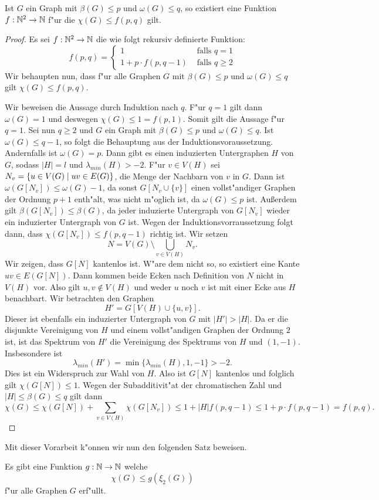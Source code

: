 \begin{lemma}
  Ist $G$ ein Graph mit $\beta(G) \leq p$ und $\omega(G) \leq q$, so existiert eine Funktion $f:{\mathbb{N}} ^{2} \to {\mathbb{N}}$ f"ur die $\chi(G) \leq f(p,q) $ gilt. 
  \label{lem:funktionxilemma}
\end{lemma}
\begin{proof}
  Es sei $f:{\mathbb{N}}^{2}\to {\mathbb{N}}$ die wie folgt rekursiv definierte Funktion:
  $$f(p,q) = \begin{cases}
    1 & \text{ falls } q = 1 \\
    1+p\cdot f(p,q-1) & \text{ falls } q \geq 2
  \end{cases}$$
  Wir behaupten nun, dass f"ur alle Graphen $G$ mit $\beta(G) \leq p$ und $\omega(G)  \leq q$ gilt $\chi(G) \leq f(p,q)$. 

  Wir beweisen die Aussage durch Induktion nach $q$. F"ur $q=1$ gilt dann $\omega(G) = 1$ und deswegen $\chi(G) \leq 1 = f(p,1)$. Somit gilt die Aussage f"ur $q=1$. 
  Sei nun $q \geq 2$ und $G$ ein Graph mit $\beta(G) \leq p$ und $\omega(G) \leq q$. Ist $\omega(G) \leq q-1$, so folgt die Behauptung aus der Induktionsvoraussetzung. 
  Andernfalls ist $\omega(G) = p$.
  Dann gibt es einen induzierten Untergraphen $H$ von $G$, sodass $|H|=l$ und $\lambda_{min}(H)> -2$. F"ur $v\in V(H)$ sei $N_v = \{u\in V(G) \;|\; uv\in E(G) \}$, die Menge der Nachbarn von
  $v$ in $G$. Dann ist $\omega(G[N_v]) \leq \omega(G) -1 $, da sonst $G[N_v\cup \{v\}]$ einen vollst"andiger Graphen der Ordnung $p+1$ enth"alt, was nicht m"oglich ist, da $\omega(G) \leq p$ ist. Au{\ss}erdem gilt $\beta(G[N_v]) \leq \beta(G)$, da jeder induzierte Untergraph von $G[N_v]$ wieder ein induzierter Untergraph von $G$ ist. Wegen der Induktionsvorraussetzung folgt dann, dass $\chi(G[N_v]) \leq f(p,q-1)$ richtig ist. 
  Wir setzen $$N = V(G) \setminus \bigcup\limits_{v\in V(H)} N_v.$$ 
  Wir zeigen, dass $G[N]$ kantenlos ist. W"are dem nicht so, so existiert eine Kante $uv\in E(G[N])$. 
  Dann kommen beide Ecken nach Definition von $N$ nicht in $V(H)$ vor. 
  Also gilt $u,v\notin V(H)$ und weder $u$ noch $v$ ist mit einer Ecke aus $H$ benachbart. Wir betrachten den Graphen $$H' = G[V(H) \cup \{u,v\}].$$ Dieser ist ebenfalls ein induzierter Untergraph von $G$ mit $|H'| > |H|$. Da er die disjunkte Vereinigung von $H$ und einem vollst"andigen Graphen der Ordnung $2$ ist, ist das Spektrum von $H'$ die Vereinigung des Spektrums von $H$ und $(1,-1)$. Insbesondere ist $$\lambda_{min}(H') = \min \{\lambda_{min}(H),1,-1\} > -2.$$ 
  Dies ist ein Widerspruch zur Wahl von $H$. Also ist $G[N]$ kantenlos und folglich gilt $\chi(G[N]) \leq 1$. 
  Wegen der Subadditivit"at der chromatischen Zahl und $|H| \leq \beta(G) \leq q$ gilt dann $$\chi(G) \leq \chi(G[N]) + \sum\limits_{v\in V(H)}\chi(G[N_v]) \leq 1 + |H|f(p,q-1)  \leq 1+p\cdot f(p,q-1)= f(p,q).$$
\end{proof}
Mit dieser Vorarbeit k"onnen wir nun den folgenden Satz beweisen.
\begin{theorem}
  Es gibt eine Funktion $g:{\mathbb{N}} \to {\mathbb{N}}$ welche $$\chi(G) \leq g(\xi_{2}(G))$$ f"ur alle Graphen $G$ erf"ullt. 
  \label{thm:funktionxi}
\end{theorem}

